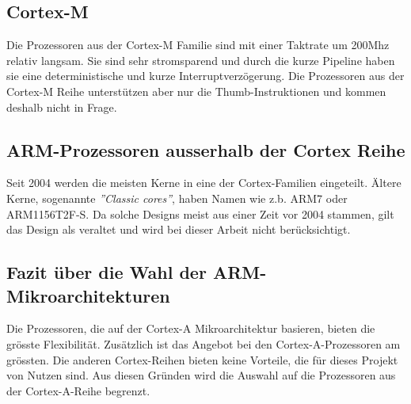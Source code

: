 \subsection{Cortex-M}
Die Prozessoren aus der Cortex-M Familie sind mit einer Taktrate um 200Mhz relativ langsam.
Sie sind sehr stromsparend und durch die kurze Pipeline haben sie eine deterministische und kurze Interruptverzögerung.
Die Prozessoren aus der Cortex-M Reihe unterstützen aber nur die Thumb-Instruktionen und kommen deshalb nicht in Frage.

\subsection{ARM-Prozessoren ausserhalb der Cortex Reihe}
Seit 2004 werden die meisten Kerne in eine der Cortex-Familien eingeteilt.
Ältere Kerne, sogenannte \textit{''Classic cores''}, haben Namen wie z.b. ARM7 oder ARM1156T2F-S.
Da solche Designs meist aus einer Zeit vor 2004 stammen, gilt das Design als veraltet und wird bei dieser Arbeit nicht berücksichtigt.

\subsection{Fazit über die Wahl der ARM-Mikroarchitekturen}
Die Prozessoren, die auf der Cortex-A Mikroarchitektur basieren, bieten die grösste Flexibilität.
Zusätzlich ist das Angebot bei den Cortex-A-Prozessoren am grössten.
Die anderen Cortex-Reihen bieten keine Vorteile, die für dieses Projekt von Nutzen sind.
Aus diesen Gründen wird die Auswahl auf die Prozessoren aus der Cortex-A-Reihe begrenzt.

